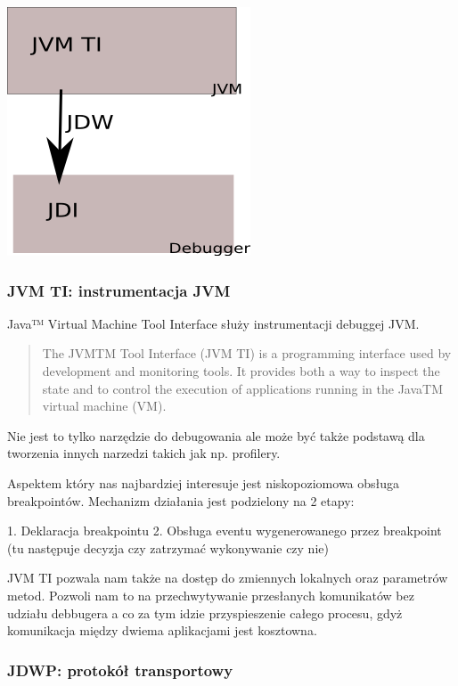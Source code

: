 \includegraphics{imgs/jdpa}

\subsubsection{JVM TI: instrumentacja JVM} 

Java™ Virtual Machine Tool Interface służy instrumentacji debuggej JVM.

\begin{quote}
The JVMTM Tool Interface (JVM TI) is a programming interface used by development and monitoring tools. It provides both a way to inspect the state and to control the execution of applications running in the JavaTM virtual machine (VM). \cite{jvmtiSpec}
\end{quote}

Nie jest to tylko narzędzie do debugowania ale może być także podstawą dla tworzenia innych narzedzi takich jak np. profilery.

Aspektem który nas najbardziej interesuje jest niskopoziomowa obsługa breakpointów. Mechanizm działania jest podzielony na 2 etapy:

1. Deklaracja breakpointu
2. Obsługa eventu wygenerowanego przez breakpoint (tu następuje decyzja czy zatrzymać wykonywanie czy nie)

JVM TI pozwala nam także na dostęp do zmiennych lokalnych oraz parametrów metod. Pozwoli nam to na przechwytywanie przesłanych komunikatów bez udziału debbugera a co za tym idzie przyspieszenie całego procesu, gdyż komunikacja między dwiema aplikacjami jest kosztowna.


\subsubsection{JDWP: protokół transportowy}

